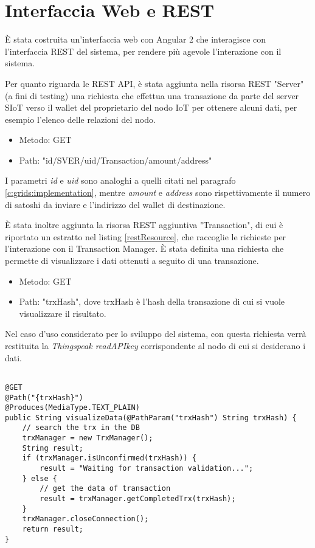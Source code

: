 \section{Interfaccia Web e REST}
\label{c:integr:webrest}

È stata costruita un'interfaccia web con Angular 2 che interagisce con l'interfaccia REST\cite{FerreiraFilho2009} del sistema, per rendere più agevole l'interazione con il sistema.


Per quanto riguarda le REST API, è stata aggiunta nella risorsa REST "Server" (a fini di testing) una richiesta che effettua una transazione da parte del server SIoT verso il wallet del proprietario del nodo IoT per ottenere alcuni dati, per esempio l'elenco delle relazioni del nodo.
\begin{itemize}
    \item Metodo: GET
    \item Path: "{id}/SVER/{uid}/Transaction/{amount}/{address}"
\end{itemize}

I parametri \textit{id} e \textit{uid} sono analoghi a quelli citati nel paragrafo \ref{c:grids:implementation}, mentre \textit{amount} e \textit{address} sono rispettivamente il numero di satoshi da inviare e l'indirizzo del wallet di destinazione.

È stata inoltre aggiunta la risorsa REST aggiuntiva "Transaction", di cui è riportato un estratto nel listing \ref{restResource}, che raccoglie le richieste per l'interazione con il Transaction Manager. È stata definita una richiesta che permette di visualizzare i dati ottenuti a seguito di una transazione.
\begin{itemize}
    \item Metodo: GET
    \item Path: "{trxHash}", dove trxHash è l'hash della transazione di cui si vuole visualizzare il risultato.
\end{itemize}

Nel caso d'uso considerato per lo sviluppo del sistema, con questa richiesta verrà restituita la \textit{Thingspeak readAPIkey} corrispondente al nodo di cui si desiderano i dati.


\begin{lstlisting}[caption={TransactionResource.java},label={restResource},style={c}]

@GET
@Path("{trxHash}")
@Produces(MediaType.TEXT_PLAIN)
public String visualizeData(@PathParam("trxHash") String trxHash) {
    // search the trx in the DB
    trxManager = new TrxManager();
    String result;
    if (trxManager.isUnconfirmed(trxHash)) {
        result = "Waiting for transaction validation...";
    } else {
        // get the data of transaction
        result = trxManager.getCompletedTrx(trxHash);
    }
    trxManager.closeConnection();
    return result;
}
\end{lstlisting}

